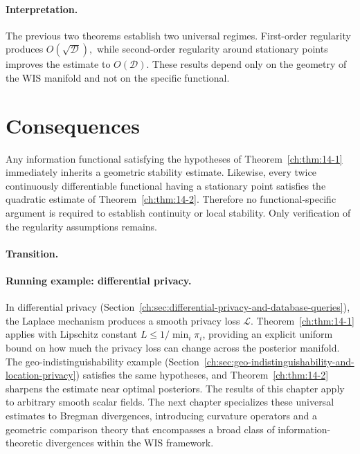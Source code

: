 \paragraph{Interpretation.}
The previous two theorems establish two universal regimes.
First-order regularity produces
\(O(\sqrt{\mathcal D}),\)
while second-order regularity around stationary points improves the
estimate to
\(O(\mathcal D).\)
These results depend only on the geometry of the WIS manifold and not on
the specific functional.
\section{Consequences}\label{ch:sec:consequences-universal_bounds}
Any information functional satisfying the hypotheses of Theorem~\ref{ch:thm:14-1}
immediately inherits a geometric stability estimate.
Likewise, every twice continuously differentiable functional having a
stationary point satisfies the quadratic estimate of Theorem~\ref{ch:thm:14-2}.
Therefore no functional-specific argument is required to establish
continuity or local stability.
Only verification of the regularity assumptions remains.
\paragraph{Transition.}
\paragraph{Running example: differential privacy.}
In differential privacy (Section~\ref{ch:sec:differential-privacy-and-database-queries}), the Laplace mechanism produces a smooth privacy loss $\mathcal L$.  Theorem~\ref{ch:thm:14-1} applies with Lipschitz constant $L\le 1/\min_i\pi_i$, providing an explicit uniform bound on how much the privacy loss can change across the posterior manifold.  The geo-indistinguishability example (Section~\ref{ch:sec:geo-indistinguishability-and-location-privacy}) satisfies the same hypotheses, and Theorem~\ref{ch:thm:14-2} sharpens the estimate near optimal posteriors.
The results of this chapter apply to arbitrary smooth scalar fields.
The next chapter specializes these universal estimates to Bregman
divergences, introducing curvature operators and a geometric comparison
theory that encompasses a broad class of information-theoretic
divergences within the WIS framework.
